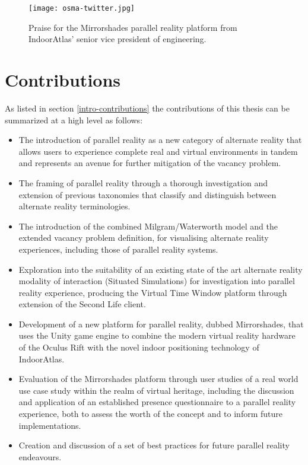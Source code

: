 \begin{figure}[t]
	\begin{center}
		\texttt{[image: osma-twitter.jpg]}
		\caption{Praise for the Mirrorshades parallel reality platform from IndoorAtlas' senior vice president of engineering.}
		\label{osma-twitter.jpg}
	\end{center}	
\end{figure}


\section{Contributions}

As listed in section \ref{intro-contributions} the contributions of this thesis can be summarized at a high level as follows:

\begin{itemize}
	\item The introduction of parallel reality as a new category of alternate reality that allows users to experience complete real and virtual environments in tandem and represents an avenue for further mitigation of the vacancy problem.
	\item The framing of parallel reality through a thorough investigation and extension of previous taxonomies that classify and distinguish between alternate reality terminologies.
	\item The introduction of the combined Milgram/Waterworth model and the extended vacancy problem definition, for visualising alternate reality experiences, including those of parallel reality systems.
	\item Exploration into the suitability of an existing state of the art alternate reality modality of interaction (Situated Simulations) for investigation into parallel reality experience, producing the Virtual Time Window platform through extension of the Second Life client.
	\item Development of a new platform for parallel reality, dubbed Mirrorshades, that uses the Unity game engine to combine the modern virtual reality hardware of the Oculus Rift with the novel indoor positioning technology of IndoorAtlas.
	\item Evaluation of the Mirrorshades platform through user studies of a real world use case study within the realm of virtual heritage, including the discussion and application of an established presence questionnaire to a parallel reality experience, both to assess the worth of the concept and to inform future implementations.
	\item Creation and discussion of a set of best practices for future parallel reality endeavours.
\end{itemize}

